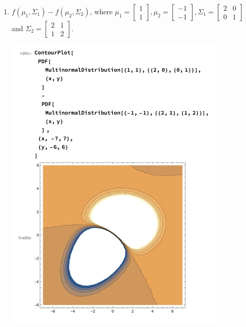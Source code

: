 \documentclass{article}
\begin{document}
\begin{enumerate}[label=(\alph*)]
    \newpage
    \item $f(\mu_1, \Sigma_1) - f(\mu_2, \Sigma_2)$, where $\mu_1 = \begin{bmatrix} 1 \\ 1 \end{bmatrix}, \mu_2 = \begin{bmatrix} -1 \\ -1 \end{bmatrix}, \Sigma_1 = \begin{bmatrix} 2 & 0 \\ 0 & 1 \end{bmatrix}$ and $\Sigma_2 = \begin{bmatrix} 2 & 1 \\ 1 & 2 \end{bmatrix}$.
    \begin{mdframed}
      \includegraphics[width=300pt]{img/hw03_2e.png}
    \end{mdframed}

\end{enumerate}

\newpage
\end{document}
